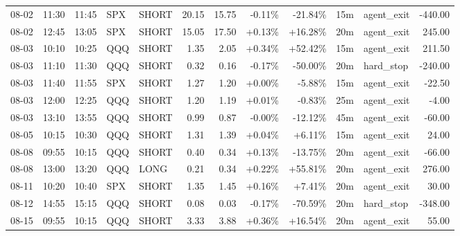 \documentclass[11pt,a4paper]{article}
\begin{document}
\begin{center}
\begin{longtable}{>{\color{txtmain}}l l l l l r r r r r >{\color{txtmain}}l r}
08-02 & 11:30 & 11:45 & SPX & SHORT & 20.15 & 15.75 & \textcolor{lossred}{-0.11\%} & \textcolor{lossred}{-21.84\%} & 15m & agent\_exit & \textcolor{lossred}{-440.00} \\
08-02 & 12:45 & 13:05 & SPX & SHORT & 15.05 & 17.50 & \textcolor{wingreen}{+0.13\%} & \textcolor{wingreen}{+16.28\%} & 20m & agent\_exit & \textcolor{wingreen}{245.00} \\
08-03 & 10:10 & 10:25 & QQQ & SHORT & 1.35 & 2.05 & \textcolor{wingreen}{+0.34\%} & \textcolor{wingreen}{+52.42\%} & 15m & agent\_exit & \textcolor{wingreen}{211.50} \\
08-03 & 11:10 & 11:30 & QQQ & SHORT & 0.32 & 0.16 & \textcolor{lossred}{-0.17\%} & \textcolor{lossred}{-50.00\%} & 20m & hard\_stop & \textcolor{lossred}{-240.00} \\
08-03 & 11:40 & 11:55 & SPX & SHORT & 1.27 & 1.20 & \textcolor{wingreen}{+0.00\%} & \textcolor{lossred}{-5.88\%} & 15m & agent\_exit & \textcolor{lossred}{-22.50} \\
08-03 & 12:00 & 12:25 & QQQ & SHORT & 1.20 & 1.19 & \textcolor{wingreen}{+0.01\%} & \textcolor{lossred}{-0.83\%} & 25m & agent\_exit & \textcolor{lossred}{-4.00} \\
08-03 & 13:10 & 13:55 & QQQ & SHORT & 0.99 & 0.87 & \textcolor{lossred}{-0.00\%} & \textcolor{lossred}{-12.12\%} & 45m & agent\_exit & \textcolor{lossred}{-60.00} \\
08-05 & 10:15 & 10:30 & QQQ & SHORT & 1.31 & 1.39 & \textcolor{wingreen}{+0.04\%} & \textcolor{wingreen}{+6.11\%} & 15m & agent\_exit & \textcolor{wingreen}{24.00} \\
08-08 & 09:55 & 10:15 & QQQ & SHORT & 0.40 & 0.34 & \textcolor{wingreen}{+0.13\%} & \textcolor{lossred}{-13.75\%} & 20m & agent\_exit & \textcolor{lossred}{-66.00} \\
08-08 & 13:00 & 13:20 & QQQ & LONG & 0.21 & 0.34 & \textcolor{wingreen}{+0.22\%} & \textcolor{wingreen}{+55.81\%} & 20m & agent\_exit & \textcolor{wingreen}{276.00} \\
08-11 & 10:20 & 10:40 & SPX & SHORT & 1.35 & 1.45 & \textcolor{wingreen}{+0.16\%} & \textcolor{wingreen}{+7.41\%} & 20m & agent\_exit & \textcolor{wingreen}{30.00} \\
08-12 & 14:55 & 15:15 & QQQ & SHORT & 0.08 & 0.03 & \textcolor{lossred}{-0.17\%} & \textcolor{lossred}{-70.59\%} & 20m & hard\_stop & \textcolor{lossred}{-348.00} \\
08-15 & 09:55 & 10:15 & QQQ & SHORT & 3.33 & 3.88 & \textcolor{wingreen}{+0.36\%} & \textcolor{wingreen}{+16.54\%} & 20m & agent\_exit & \textcolor{wingreen}{55.00} \\

\end{longtable}
\end{center}
\end{document}
